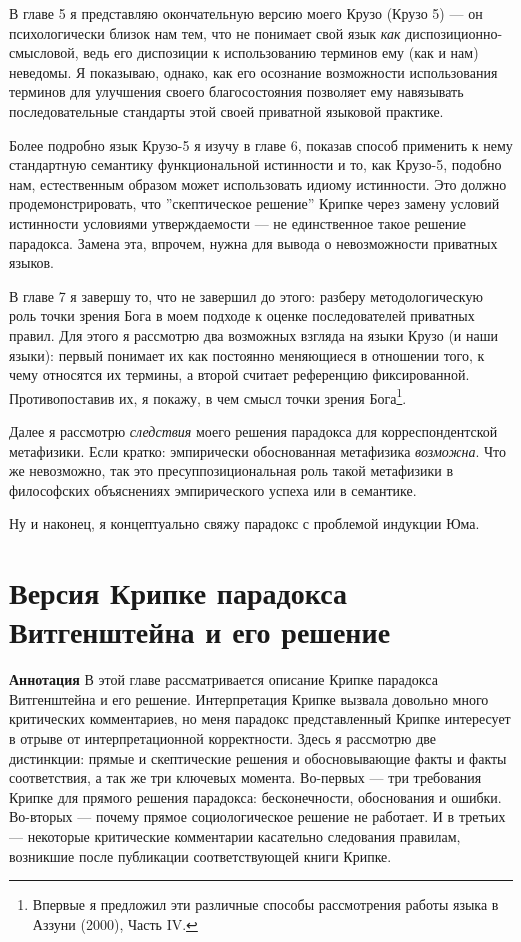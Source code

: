 \documentclass[11pt]{book}
\begin{document}
В главе 5 я представляю окончательную версию моего Крузо (Крузо 5) --- он психологически близок нам тем, что не понимает свой язык \textit{как} диспозиционно-смысловой, ведь его диспозиции к использованию терминов ему (как и нам) неведомы. Я показываю, однако, как его осознание возможности использования терминов для улучшения своего благосостояния позволяет ему навязывать последовательные стандарты этой своей приватной языковой практике.

Более подробно язык Крузо-5 я изучу в главе 6, показав способ применить к нему стандартную семантику функциональной истинности и то, как Крузо-5, подобно нам, естественным образом может использовать идиому истинности. Это должно продемонстрировать, что ''скептическое решение'' Крипке через замену условий истинности условиями утверждаемости --- не единственное такое решение парадокса. Замена эта, впрочем, нужна для вывода о невозможности приватных языков.

В главе 7 я завершу то, что не завершил до этого: разберу методологическую роль точки зрения Бога в моем подходе к оценке последователей приватных правил. Для этого я рассмотрю два возможных взгляда на языки Крузо (и наши языки): первый понимает их как постоянно меняющиеся в отношении того, к чему относятся их термины, а второй считает референцию фиксированной. Противопоставив их, я покажу, в чем смысл точки зрения Бога\footnote{Впервые я предложил эти различные способы рассмотрения работы языка в Аззуни (2000), Часть IV.}.

Далее я рассмотрю \textit{следствия} моего решения парадокса для корреспондентской метафизики. Если кратко: эмпирически обоснованная метафизика \textit{возможна}. Что же невозможно, так это пресуппозициональная роль такой метафизики в философских объяснениях эмпирического успеха или в семантике.

Ну и наконец, я концептуально свяжу парадокс с проблемой индукции Юма.

\chapter{Версия Крипке парадокса Витгенштейна и его решение}

\qquad

\textbf{Аннотация} \quad В этой главе рассматривается описание Крипке парадокса Витгенштейна и его решение. Интерпретация Крипке вызвала довольно много критических комментариев, но меня парадокс представленный Крипке интересует в отрыве от интерпретационной корректности. Здесь я рассмотрю две дистинкции: прямые и скептические решения и обосновывающие факты и факты соответствия, а так же три ключевых момента. Во-первых --- три требования Крипке для прямого решения парадокса: бесконечности, обоснования и ошибки. Во-вторых --- почему прямое социологическое решение не работает. И в третьих --- некоторые критические комментарии касательно следования правилам, возникшие после публикации соответствующей книги Крипке.
\end{document}
